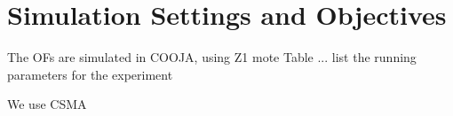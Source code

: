 \section{Simulation Settings and Objectives}

The OFs are simulated in COOJA, using Z1 mote
Table ... list the running parameters for the experiment

We use CSMA 

